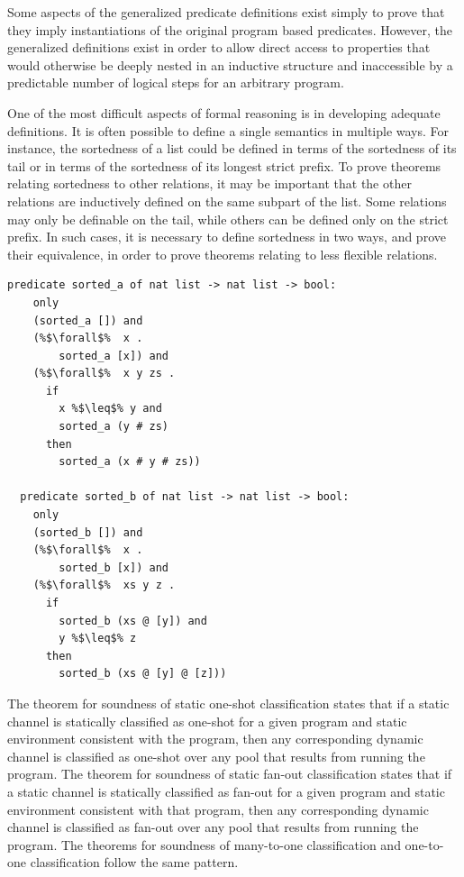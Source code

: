 \documentclass{article}
\begin{document}
Some aspects of the generalized predicate definitions exist simply to prove that they imply
instantiations of the original program based predicates. However, the generalized
definitions exist in order to allow direct access to properties that would
otherwise be deeply nested
in an inductive structure and inaccessible by a predictable number of
logical steps for an arbitrary
program.

One of the most difficult aspects of formal reasoning is in developing adequate definitions.
It is often possible to define a single semantics in multiple ways.
For instance, the sortedness of a list could be defined in terms of the sortedness of its tail
or in terms of the sortedness of its longest strict prefix. To prove theorems relating
sortedness to other relations, it may be important that the other relations are inductively
defined on the same subpart of the list. Some relations may only be definable on the tail,
while others can be defined only on the strict prefix. In such cases, it is necessary to
define sortedness in two ways, and prove their equivalence, in order to prove theorems relating
to less flexible relations.

\begin{lstlisting}[language=logic, escapechar=\%]
  predicate sorted_a of nat list -> nat list -> bool:
    only
    (sorted_a []) and
    (%$\forall$%  x .
        sorted_a [x]) and
    (%$\forall$%  x y zs .
      if 
        x %$\leq$% y and
        sorted_a (y # zs)
      then
        sorted_a (x # y # zs))

  predicate sorted_b of nat list -> nat list -> bool:
    only
    (sorted_b []) and
    (%$\forall$%  x .
        sorted_b [x]) and
    (%$\forall$%  xs y z .
      if 
        sorted_b (xs @ [y]) and
        y %$\leq$% z 
      then
        sorted_b (xs @ [y] @ [z]))
  \end{lstlisting}

The theorem for soundness of static one-shot classification states that if a static channel is
statically classified as one-shot for a given program and
static environment consistent with the
program, then any corresponding dynamic channel is classified
as one-shot over any pool that results
from running the program. The theorem for soundness of
static fan-out classification states that if
a static channel is statically classified as fan-out for a given program and static environment
consistent with that program, then any corresponding dynamic channel is classified as fan-out
over any pool that results from running the program.  The theorems for soundness of many-to-one
classification and one-to-one classification follow the same pattern. 
\end{document}
